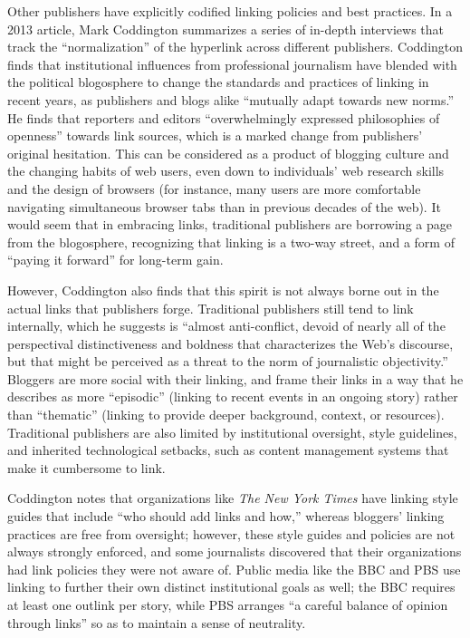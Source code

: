 Other publishers have explicitly codified linking policies and best practices. In a 2013 article, Mark Coddington summarizes a series of in-depth interviews that track the ``normalization'' of the hyperlink across different publishers. Coddington finds that institutional influences from professional journalism have blended with the political blogosphere to change the standards and practices of linking in recent years, as publishers and blogs alike ``mutually adapt towards new norms.''\autocite[140]{coddington_normalizing_2014} He finds that reporters and editors ``overwhelmingly expressed philosophies of openness'' towards link sources, which is a marked change from publishers' original hesitation.\autocite[2017]{coddington_building_2012} This can be considered as a product of blogging culture and the changing habits of web users, even down to individuals' web research skills and the design of browsers (for instance, many users are more comfortable navigating simultaneous browser tabs than in previous decades of the web). It would seem that in embracing links, traditional publishers are borrowing a page from the blogosphere, recognizing that linking is a two-way street, and a form of ``paying it forward'' for long-term gain.

However, Coddington also finds that this spirit is not always borne out in the actual links that publishers forge. Traditional publishers still tend to link internally, which he suggests is ``almost anti-conflict, devoid of nearly all of the perspectival distinctiveness and boldness that characterizes the Web's discourse, but that might be perceived as a threat to the norm of journalistic objectivity.''\autocite[2021]{coddington_building_2012} Bloggers are more social with their linking, and frame their links in a way that he describes as more ``episodic'' (linking to recent events in an ongoing story) rather than ``thematic'' (linking to provide deeper background, context, or resources). Traditional publishers are also limited by institutional oversight, style guidelines, and inherited technological setbacks, such as content management systems that make it cumbersome to link.\autocites[148-9]{coddington_normalizing_2014}[363]{vobic_practice_2013}

Coddington notes that organizations like \emph{The New York Times} have linking style guides that include ``who should add links and how,'' whereas bloggers' linking practices are free from oversight; however, these style guides and policies are not always strongly enforced, and some journalists discovered that their organizations had link policies they were not aware of.\autocite[149]{coddington_normalizing_2014} Public media like the BBC and PBS use linking to further their own distinct institutional goals as well; the BBC requires at least one outlink per story, while PBS arranges ``a careful balance of opinion through links'' so as to maintain a sense of neutrality.\autocites[151]{coddington_normalizing_2014}[35-7]{bbc_putting_2010}

